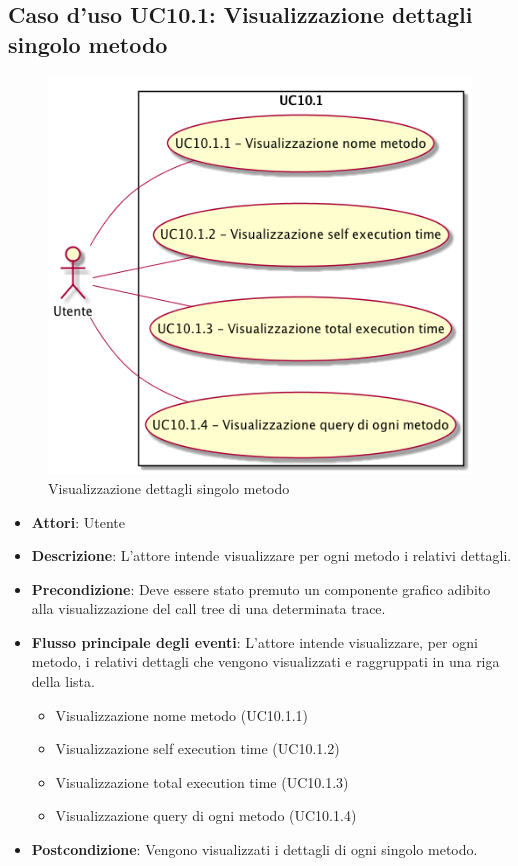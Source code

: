 \subsection{Caso d'uso UC10.1: Visualizzazione dettagli singolo metodo}
\begin{figure} [H]
	\centering
	\includegraphics[scale=0.45]{./UC/UC10-1.png}
	\caption{Visualizzazione dettagli singolo metodo}\label{}
\end{figure}
\begin{itemize}
	\item \textbf{Attori}: Utente
	\item \textbf{Descrizione}: L'attore intende visualizzare per ogni metodo i relativi dettagli.
	\item \textbf{Precondizione}: Deve essere stato premuto un componente grafico adibito alla visualizzazione del call tree di una determinata trace.
	
	\item \textbf{Flusso principale degli eventi}: L'attore intende visualizzare, per ogni metodo, i relativi dettagli che vengono visualizzati e raggruppati in una riga della lista.
	\begin{itemize}
		\item Visualizzazione nome metodo (UC10.1.1)
		\item Visualizzazione self execution time (UC10.1.2)
		\item Visualizzazione total execution time (UC10.1.3)
		\item Visualizzazione query di ogni metodo (UC10.1.4)
	\end{itemize}
	\item \textbf{Postcondizione}: Vengono visualizzati i dettagli di ogni singolo metodo.
\end{itemize}
